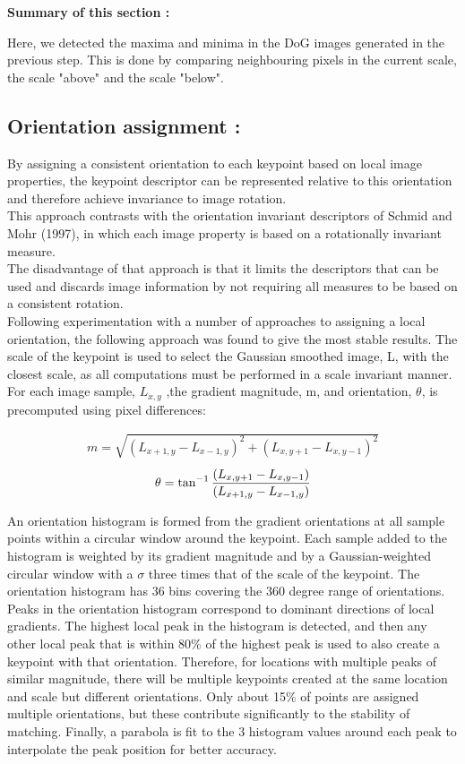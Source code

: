 \textbf{Summary of this section :}

Here, we detected the maxima and minima in the DoG images generated in the previous step. This is done by comparing neighbouring pixels in the current scale, the scale "above" and the scale "below".


\subsection{Orientation assignment :}
By assigning a consistent orientation to each keypoint based on local image properties,
the keypoint descriptor can be represented relative to this orientation and therefore achieve
invariance to image rotation.\\ This approach contrasts with the orientation invariant descriptors
of Schmid and Mohr (1997), in which each image property is based on a rotationally
invariant measure.\\ The disadvantage of that approach is that it limits the descriptors that
can be used and discards image information by not requiring all measures to be based on a
consistent rotation.\\

Following experimentation with a number of approaches to assigning a local orientation,
the following approach was found to give the most stable results. The scale of the
keypoint is used to select the Gaussian smoothed image, L, with the closest scale, as all
computations must be performed in a scale invariant manner. For each image sample, $L_{x,y}$ ,the gradient magnitude, m, and orientation, $\theta$, is precomputed using pixel differences:

\begin{align}
 m  =\sqrt{(L_{x+1,y} - L_{x-1,y})^2 + (L_{x,y+1} - L_{x,y-1})^2}
\end{align}
\begin{align}
  \theta = \tan^{\small{-1}}\frac{(L_{x,y+1} - L_{x,y-1})}{(L_{x+1,y} - L_{x-1,y})}
\end{align}

An orientation histogram is formed from the gradient orientations at all sample points
within a circular window around the keypoint. Each sample added to the histogram is
weighted by its gradient magnitude and by a Gaussian-weighted circular window with a $\sigma$
three times that of the scale of the keypoint. The orientation histogram has 36 bins covering
the 360 degree range of orientations.
Peaks in the orientation histogram correspond to dominant directions of local gradients.
The highest local peak in the histogram is detected, and then any other local peak that is
within 80\% of the highest peak is used to also create a keypoint with that orientation.
Therefore, for locations with multiple peaks of similar magnitude, there will be multiple
keypoints created at the same location and scale but different orientations. Only about
15\% of points are assigned multiple orientations, but these contribute significantly to the
stability of matching. Finally, a parabola is fit to the 3 histogram values around each peak
to interpolate the peak position for better accuracy.


